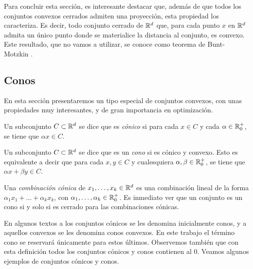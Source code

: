 Para concluir esta sección, es interesante destacar que, además de que todos los conjuntos convexos cerrados admiten una proyección, esta propiedad los caracteriza. Es decir, todo conjunto cerrado de $\mathbb{R}^d$ que, para cada punto $x$ en $\mathbb{R}^d$ admita un único punto donde se materialice la distancia al conjunto, es convexo. Este resultado, que no vamos a utilizar, se conoce como teorema de Bunt-Motzkin \cite{variations_convex}.

\subsection{Conos}

En esta sección presentaremos un tipo especial de conjuntos convexos, con unas propiedades muy interesantes, y de gran importancia en optimización.

\begin{definition}[Conos]
    Un subconjunto $C \subset \mathbb{R}^d$ se dice que es \emph{cónico} si para cada $x \in C$ y cada $\alpha \in \mathbb{R}^+_0$, se tiene que $\alpha x \in C$.

    Un subconjunto $C \subset \mathbb{R}^d$ se dice que es un \emph{cono} si es cónico y convexo. Esto es equivalente a decir que para cada $x,y \in C$ y cualesquiera $\alpha,\beta \in \mathbb{R}^+_0$, se tiene que $\alpha x + \beta y \in C$.

    Una \emph{combinación cónica} de $x_1,\dots,x_k \in \mathbb{R}^d$ es una combinación lineal de la forma $\alpha_1x_1+ \dots+\alpha_kx_k$, con $\alpha_1,\dots,\alpha_k \in \mathbb{R}^+_0$. Es inmediato ver que un conjunto es un cono si y solo si es cerrado para las combinaciones cónicas.
\end{definition}

En algunos textos a los conjuntos cónicos se les denomina inicialmente conos, y a aquellos convexos se les denomina conos convexos. En este trabajo el término cono se reservará únicamente para estos últimos. Observemos también que con esta definición todos los conjuntos cónicos y conos contienen al 0. Veamos algunos ejemplos de conjuntos cónicos y conos.

